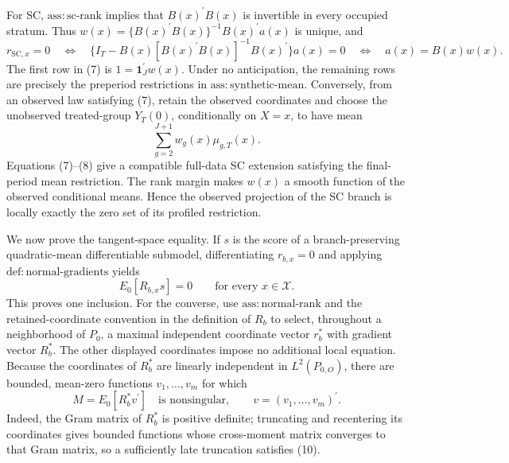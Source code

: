 For SC, \(\mathrm{ass{:}sc\text{-}rank}\) implies that \(B(x)^{\prime}B(x)\) is invertible in every occupied stratum.  Thus \(w(x)=\{B(x)^{\prime}B(x)\}^{-1}B(x)^{\prime}a(x)\) is unique, and
\[
 r_{\mathrm{SC},x}=0
 \quad\Longleftrightarrow\quad
 \{I_T-B(x)[B(x)^{\prime}B(x)]^{-1}B(x)^{\prime}\}a(x)=0
 \quad\Longleftrightarrow\quad
 a(x)=B(x)w(x).
 \tag{7}
\]
The first row in (7) is \(1=\mathbf 1_J^{\prime}w(x)\).  Under no anticipation, the remaining rows are precisely the preperiod restrictions in \(\mathrm{ass{:}synthetic\text{-}mean}\).  Conversely, from an observed law satisfying (7), retain the observed coordinates and choose the unobserved treated-group \(Y_T(0)\), conditionally on \(X=x\), to have mean
\[
 \sum_{g=2}^{J+1}w_g(x)\mu_{g,T}(x).
 \tag{8}
\]
Equations (7)--(8) give a compatible full-data SC extension satisfying the final-period mean restriction.  The rank margin makes \(w(x)\) a smooth function of the observed conditional means.  Hence the observed projection of the SC branch is locally exactly the zero set of its profiled restriction.

We now prove the tangent-space equality.  If \(s\) is the score of a branch-preserving quadratic-mean differentiable submodel, differentiating \(r_{b,x}=0\) and applying \(\mathrm{def{:}normal\text{-}gradients}\) yields
\[
 E_0[R_{b,x}s]=0
 \qquad\text{for every }x\in\mathcal X.
 \tag{9}
\]
This proves one inclusion.  For the converse, use \(\mathrm{ass{:}normal\text{-}rank}\) and the retained-coordinate convention in the definition of \(R_b\) to select, throughout a neighborhood of \(P_0\), a maximal independent coordinate vector \(r_b^{\ast}\) with gradient vector \(R_b^{\ast}\).  The other displayed coordinates impose no additional local equation.  Because the coordinates of \(R_b^{\ast}\) are linearly independent in \(L^2(P_{0,O})\), there are bounded, mean-zero functions \(v_1,\ldots,v_m\) for which
\[
 M=E_0[R_b^{\ast}v^{\prime}]
 \quad\text{is nonsingular},
 \qquad v=(v_1,\ldots,v_m)^{\prime}.
 \tag{10}
\]
Indeed, the Gram matrix of \(R_b^{\ast}\) is positive definite; truncating and recentering its coordinates gives bounded functions whose cross-moment matrix converges to that Gram matrix, so a sufficiently late truncation satisfies (10).

